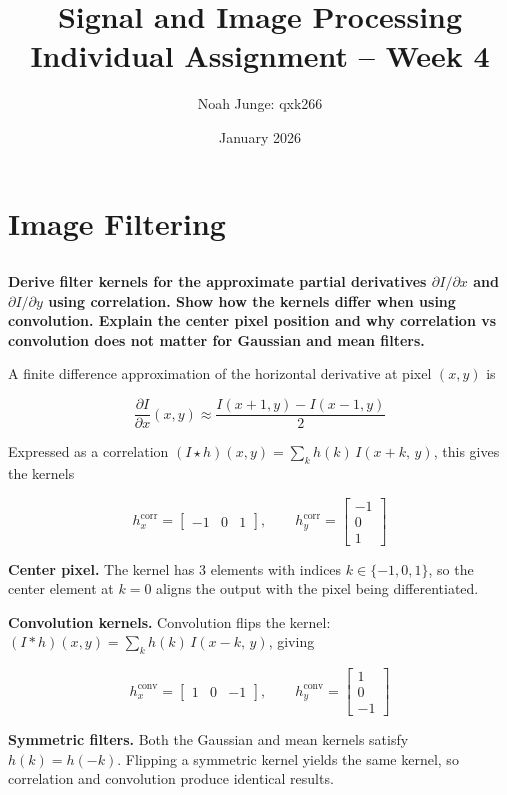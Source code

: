 \documentclass[12pt]{article} %
\title{Signal and Image Processing\\
Individual Assignment -- Week 4}
\author{Noah Junge: qxk266}
\date{January 2026}
\begin{document}
\maketitle

\section{Image Filtering}

\subsection{}
\textbf{Derive filter kernels for the approximate partial derivatives $\partial I / \partial x$ and $\partial I / \partial y$ using correlation. Show how the kernels differ when using convolution. Explain the center pixel position and why correlation vs convolution does not matter for Gaussian and mean filters.}

A finite difference approximation of the horizontal derivative at pixel $(x, y)$ is

$$\frac{\partial I}{\partial x}(x,y) \approx \frac{I(x+1,y) - I(x-1,y)}{2}$$

Expressed as a correlation $(I \star h)(x,y) = \sum_k h(k)\, I(x+k,\, y)$, this gives the kernels

$$h_x^{\text{corr}} = \begin{bmatrix} -1 & 0 & 1 \end{bmatrix}, \qquad h_y^{\text{corr}} = \begin{bmatrix} -1 \\ 0 \\ 1 \end{bmatrix}$$

\textbf{Center pixel.} The kernel has 3 elements with indices $k \in \{-1, 0, 1\}$, so the center element at $k = 0$ aligns the output with the pixel being differentiated.

\textbf{Convolution kernels.} Convolution flips the kernel: $(I * h)(x,y) = \sum_k h(k)\, I(x-k,\, y)$, giving

$$h_x^{\text{conv}} = \begin{bmatrix} 1 & 0 & -1 \end{bmatrix}, \qquad h_y^{\text{conv}} = \begin{bmatrix} 1 \\ 0 \\ -1 \end{bmatrix}$$

\textbf{Symmetric filters.} Both the Gaussian and mean kernels satisfy $h(k) = h(-k)$. Flipping a symmetric kernel yields the same kernel, so correlation and convolution produce identical results.
\end{document}
